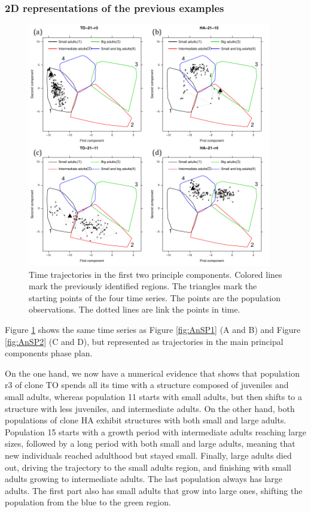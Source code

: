 \subsubsection{2D representations of the previous examples}

\begin{figure}[!ht]
\begin{center}
\includegraphics[width=0.95\textwidth]{3-1_ChapExp1/Fig/AnnSP6}
\caption[Time trajectories in the first two principle components]{Time trajectories in the first two principle components.
Colored lines mark the previously identified regions. The triangles mark the
starting points of the four time series. The points are the population
observations. The dotted lines are link the points in time.}
\label{fig:AnSP6}
\end{center}
\end{figure}

Figure \ref{fig:AnSP6} shows the same time series as Figure \ref{fig:AnSP1} (A
and B) and Figure \ref{fig:AnSP2} (C and D), but represented as trajectories in
the main principal components phase plan.

On the one hand, we now have a numerical evidence that shows that population r3
of clone TO spends all its time with a structure composed of juveniles and small
adults, whereas population 11 starts with small adults, but then shifts to a
structure with less juveniles, and intermediate adults. On the other hand, both
populations of clone HA exhibit structures with both small and large adults.
Population 15 starts with a growth period with intermediate adults reaching
large sizes, followed by a long period with both small and large adults, meaning
that new individuals reached adulthood but stayed small. Finally, large adults
died out, driving the trajectory to the small adults region, and finishing with
small adults growing to intermediate adults. The last population always has
large adults. The first part also has small adults that grow into large ones,
shifting the population from the blue to the green region.

